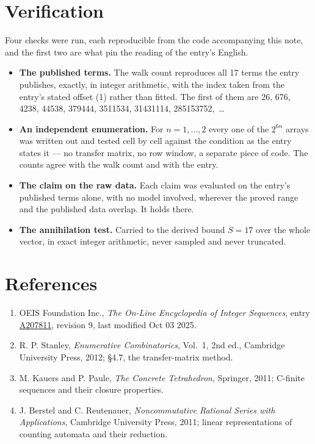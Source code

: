 \documentclass[11pt]{article}
\theoremstyle{definition}
\begin{document}
\section{Verification}

Four checks were run, each reproducible from the code accompanying this note, and the first two are what pin the reading of the entry's English.

\begin{itemize}

\item {\bfseries The published terms.} The walk count reproduces all 17 terms the entry publishes, exactly, in integer arithmetic, with the index taken from the entry's stated offset (1) rather than fitted. The first of them are 26, 676, 4238, 44538, 379444, 3511534, 31431114, 285153752,~\dots

\item {\bfseries An independent enumeration.} For $n = 1,\dots,2$ every one of the $2^{6n}$ arrays was written out and tested cell by cell against the condition as the entry states it --- no transfer matrix, no row window, a separate piece of code. The counts agree with the walk count and with the entry.

\item {\bfseries The claim on the raw data.} Each claim was evaluated on the entry's published terms alone, with no model involved, wherever the proved range and the published data overlap. It holds there.

\item {\bfseries The annihilation test.} Carried to the derived bound $S = 17$ over the whole vector, in exact integer arithmetic, never sampled and never truncated.

\end{itemize}

\section{References}

\begin{enumerate}

\item OEIS Foundation Inc., \emph{The On-Line Encyclopedia of Integer Sequences}, entry \href{https://oeis.org/A207811}{A207811}, revision 9, last modified Oct 03 2025.

\item R. P. Stanley, \emph{Enumerative Combinatorics}, Vol.~1, 2nd ed., Cambridge University Press, 2012; \S4.7, the transfer-matrix method.

\item M. Kauers and P. Paule, \emph{The Concrete Tetrahedron}, Springer, 2011; C-finite sequences and their closure properties.

\item J. Berstel and C. Reutenauer, \emph{Noncommutative Rational Series with Applications}, Cambridge University Press, 2011; linear representations of counting automata and their reduction.

\end{enumerate}
\end{document}
